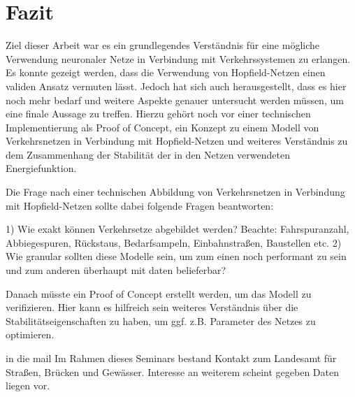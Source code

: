 \section{Fazit}

Ziel dieser Arbeit war es ein grundlegendes Verständnis für eine mögliche Verwendung neuronaler Netze in Verbindung mit Verkehrssystemen zu erlangen. Es konnte gezeigt werden, dass die Verwendung von Hopfield-Netzen einen validen Ansatz vermuten lässt. Jedoch hat sich auch herausgestellt, dass es hier noch mehr bedarf und weitere Aspekte genauer untersucht werden müssen, um eine finale Aussage zu treffen. Hierzu gehört noch vor einer technischen Implementierung als Proof of Concept, ein Konzept zu einem Modell von Verkehrsnetzen in Verbindung mit Hopfield-Netzen und weiteres Verständnis zu dem Zusammenhang der Stabilität der in den Netzen verwendeten Energiefunktion.

Die Frage nach einer technischen Abbildung von Verkehrsnetzen in Verbindung mit Hopfield-Netzen sollte dabei folgende Fragen beantworten:

1) Wie exakt können Verkehrsetze abgebildet werden? Beachte: Fahrspuranzahl, Abbiegespuren, Rückstaus, Bedarfsampeln, Einbahnstraßen, Baustellen etc.
2) Wie granular sollten diese Modelle sein, um zum einen noch performant zu sein und zum anderen überhaupt mit daten belieferbar?

Danach müsste ein Proof of Concept erstellt werden, um das Modell zu verifizieren. Hier kann es hilfreich sein weiteres Verständnis über die Stabilitätseigenschaften zu haben, um ggf. z.B. Parameter des Netzes zu optimieren.


in die mail
Im Rahmen dieses Seminars bestand Kontakt zum Landesamt für Straßen, Brücken und Gewässer. Interesse an weiterem scheint gegeben
Daten liegen vor. 